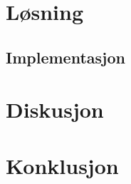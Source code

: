 \documentclass[11pt, a4paper]{report}
\begin{document}
\section{Løsning}
\subsection{Implementasjon}

\section{Diskusjon}

\section{Konklusjon}
%
\end{document}
